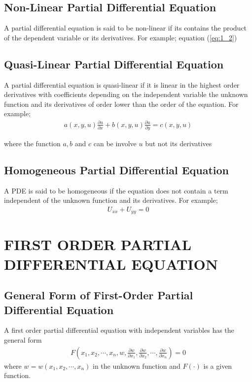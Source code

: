 \documentclass[11pt]{report}
\newcommand{\refn}[1]{(\ref{#1})}
\newcommand{\refx}[1]{\refn{eq:#1}}
\begin{document}
	\subsection{Non-Linear Partial Differential Equation}
	A partial differential equation is said to be non-linear if its contains the product of the dependent variable or its derivatives. For example; equation \refx{1_2}
	
	\subsection{Quasi-Linear Partial Differential Equation}
	A partial differential equation is quasi-linear if it is linear in the highest order derivatives with coefficients depending on the independent variable the unknown function and its derivatives of order lower than the order of the equation. For example;
	\begin{eqnarray}
		a(x,y,u)\frac{\partial u}{\partial x}+ b(x,y,u)\frac{\partial u}{\partial y} = c(x,y,u)\label{eq:3_7}
	\end{eqnarray}
	\begin{center}where the function $a,b$ and $c$ can be involve $u$ but not its derivatives\end{center}
	
	\subsection{Homogeneous Partial Differential Equation}
	A PDE is said to be homogeneous if the equation does not contain a term independent of the unknown function and its derivatives. For example;
	\begin{eqnarray}
		U_{xx} + U_{yy} = 0\label{eq:3_8}
	\end{eqnarray}
	
	\section{FIRST ORDER PARTIAL DIFFERENTIAL EQUATION}
	\subsection{General Form of First-Order Partial Differential Equation}
	A first order partial differential equation with independent variables has the general form
	\begin{eqnarray}
		F\left(x_1,x_2,\cdots,x_n,w,\frac{\partial w}{\partial x_1},\frac{\partial w}{\partial x_2},\cdots , \frac{\partial w}{\partial x_n}\right) = 0\label{eq:3_9}
	\end{eqnarray}
	where $w=w(x_1, x_2,\cdots,x_n)$ in the unknown function and $F(\cdot)$ is a given function.
	
\end{document}
